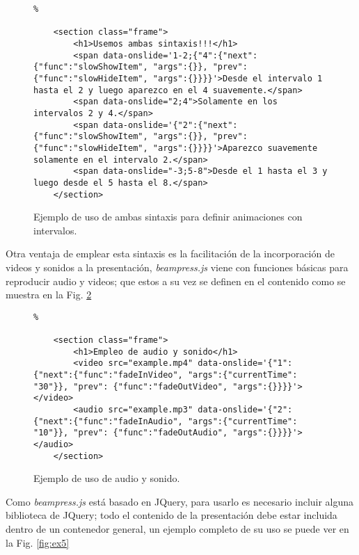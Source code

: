 			\begin{figure}[htb]%
				\begin{lstlisting}%

	<section class="frame">
		<h1>Usemos ambas sintaxis!!!</h1>
	    <span data-onslide='1-2;{"4":{"next":{"func":"slowShowItem", "args":{}}, "prev": {"func":"slowHideItem", "args":{}}}}'>Desde el intervalo 1 hasta el 2 y luego aparezco en el 4 suavemente.</span>
	    <span data-onslide="2;4">Solamente en los intervalos 2 y 4.</span>
	    <span data-onslide='{"2":{"next":{"func":"slowShowItem", "args":{}}, "prev": {"func":"slowHideItem", "args":{}}}}'>Aparezco suavemente solamente en el intervalo 2.</span>
	    <span data-onslide="-3;5-8">Desde el 1 hasta el 3 y luego desde el 5 hasta el 8.</span>
	</section>				
				\end{lstlisting}
			\caption{
				Ejemplo de uso de ambas sintaxis para definir animaciones con intervalos. 
				\label{fig:ex3} }
			\end{figure}

		Otra ventaja de emplear esta sintaxis es la facilitación de la incorporación de videos y sonidos a la presentación, \textit{beampress.js} viene con funciones básicas para reproducir audio y videos; que estos a su vez se definen en el contenido como se muestra en la Fig. \ref{fig:ex4}

			\begin{figure}[htb]%
				\begin{lstlisting}%

	<section class="frame">
		<h1>Empleo de audio y sonido</h1>
		<video src="example.mp4" data-onslide='{"1":{"next":{"func":"fadeInVideo", "args":{"currentTime": "30"}}, "prev": {"func":"fadeOutVideo", "args":{}}}}'></video>
		<audio src="example.mp3" data-onslide='{"2":{"next":{"func":"fadeInAudio", "args":{"currentTime": "10"}}, "prev": {"func":"fadeOutAudio", "args":{}}}}'></audio>    
	</section>				
				\end{lstlisting}
			\caption{
				Ejemplo de uso de audio y sonido. 
				\label{fig:ex4} }
			\end{figure}		

		Como \textit{beampress.js} está basado en JQuery, para usarlo es necesario incluir alguna biblioteca de JQuery; todo el contenido de la presentación debe estar incluida dentro de un contenedor general, un ejemplo completo de su uso se puede ver en la Fig. \ref{fig:ex5}

